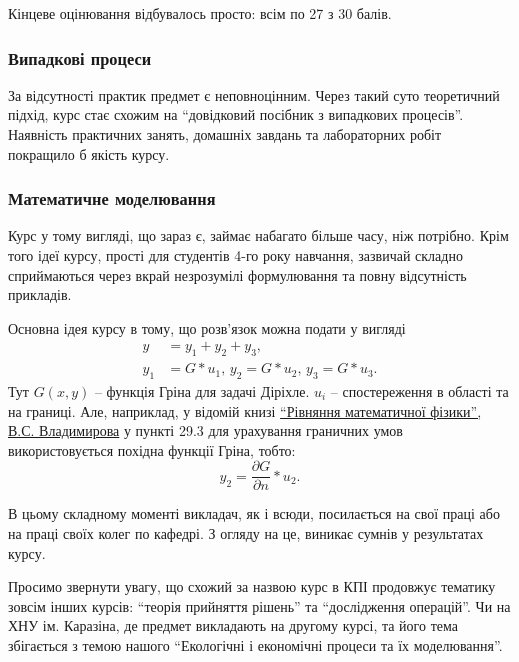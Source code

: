 \documentclass[14pt, a4paper]{extarticle}  %
\begin{document}
Кінцеве оцінювання відбувалось просто: всім по 27 з 30 балів. 

\subsubsection{Випадкові процеси}

За відсутності практик предмет є неповноцінним. Через такий суто теоретичний підхід, курс стає схожим на ``довідковий посібник з випадкових процесів''. Наявність практичних занять, домашніх завдань та лабораторних робіт покращило б якість курсу. 

\subsubsection{Математичне моделювання}
Курс у тому вигляді, що зараз є, займає набагато більше часу, ніж потрібно. Крім того ідеї курсу, прості для студентів 4-го року навчання, зазвичай складно сприймаються через вкрай незрозумілі формулювання та повну відсутність прикладів. 

Основна ідея курсу в тому, що розв'язок можна подати у вигляді 
\begin{align*}
   y &= y_1 + y_2 + y_3, \\
   y_1 &= G * u_1, \, y_2 = G * u_2, \, y_3 = G * u_3.
\end{align*}
Тут $G(x, y)$ -- функція Гріна для задачі Діріхле. $u_i$ -- спостереження в області та на границі. Але, наприклад, у відомій книзі \href{http://cmcstuff.esyr.org/vmkbotva-r15/4\%20\%D0\%BA\%D1\%83\%D1\%80\%D1\%81/8\%20\%D0\%A1\%D0\%B5\%D0\%BC\%D0\%B5\%D1\%81\%D1\%82\%D1\%80/PDE\%20Extra\%20Chapters\%20\%5BHapaev\%20M.M.\%5D/\%D0\%92.\%D0\%A1.\%20\%D0\%92\%D0\%BB\%D0\%B0\%D0\%B4\%D0\%B8\%D0\%BC\%D0\%B8\%D1\%80\%D0\%BE\%D0\%B2.\%20\%D0\%A3\%D1\%80\%D0\%B0\%D0\%B2\%D0\%BD\%D0\%B5\%D0\%BD\%D0\%B8\%D1\%8F\%20\%D0\%BC\%D0\%B0\%D1\%82\%D0\%B5\%D0\%BC\%D0\%B0\%D1\%82\%D0\%B8\%D1\%87\%D0\%B5\%D1\%81\%D0\%BA\%D0\%BE\%D0\%B9\%20\%D1\%84\%D0\%B8\%D0\%B7\%D0\%B8\%D0\%BA\%D0\%B8.pdf}{``Рівняння математичної фізики'', В.С. Владимирова} у пункті 29.3 для урахування граничних умов використовується похідна функції Гріна, тобто:
\[ y_2 = \frac{\partial G}{\partial n} * u_2. \]

В цьому складному моменті викладач, як і всюди, посилається на свої праці або на праці своїх колег по кафедрі. З огляду на це, виникає сумнів у результатах курсу. 

Просимо звернути увагу, що схожий за назвою курс в КПІ продовжує тематику зовсім інших курсів: ``теорія прийняття рішень'' та ``дослідження операцій''. Чи на ХНУ ім. Каразіна, де предмет викладають на другому курсі, та його тема збігається з темою нашого ``Екологічні і економічні процеси та їх моделювання''. 
\end{document}
